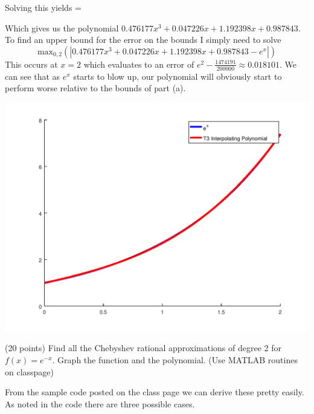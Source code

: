 \documentclass[10pt]{jhwhw}
\begin{document}
	\bigbreak
	Solving this yields
	\bigbreak
	\left[\begin{array}{c}
		a \\  b \\  c \\ d \\
	\end{array} \right] =
	\left[\begin{array}{c}
		0.476177 \\ 0.047226 \\ 1.192398 \\ 0.987843 \\
	\end{array} \right] \bigbreak

	\bigbreak
	Which gives us the polynomial $0.476177x^3 + 0.047226x + 1.192398x + 0.987843$.
	To find an upper bound for the error on the bounds I simply need to solve
	$$
		\text{max}_{0,2}(|0.476177x^3 + 0.047226x + 1.192398x + 0.987843 - e^x|)
	$$
	This occurs at $x=2$ which evaluates to an error of $e^2 - \frac{1474191}{200000} \approx 0.018101$.
	We can see that as $e^x$ starts to blow up, our polynomial will obviously start to perform worse
	relative to the bounds of part (a).

	\includegraphics[scale=0.75]{p3b}

\problem{} (20 points)
	Find all the Chebyshev rational approximations of degree 2 for $f(x) = e^{-x}$.
	Graph the function and the polynomial. (Use MATLAB routines on classpage)

\solution

	From the sample code posted on the class page we can derive these pretty easily. \\
	As noted in the code there are three possible cases.
\end{document}
